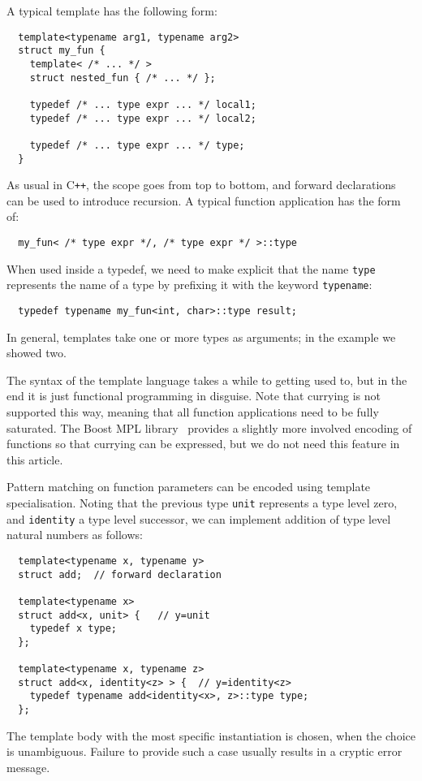 \documentclass{llncs}
\newcommand*{\Cpp}{C\texttt{++}}
\begin{document}
  A typical template has the following form:
  \begin{lstlisting}
  template<typename arg1, typename arg2>
  struct my_fun {
    template< /* ... */ >
    struct nested_fun { /* ... */ };

    typedef /* ... type expr ... */ local1;
    typedef /* ... type expr ... */ local2;

    typedef /* ... type expr ... */ type;
  }
  \end{lstlisting}
  As usual in \Cpp, the scope goes from top to bottom,
  and forward declarations can be used to introduce recursion.
  A typical function application has the form of:
  \begin{lstlisting}
  my_fun< /* type expr */, /* type expr */ >::type
  \end{lstlisting}
  When used inside a typedef, we need to make explicit that the
  name \lstinline$type$ represents the name of a type by prefixing
  it with the keyword \lstinline$typename$:
  \begin{lstlisting}
  typedef typename my_fun<int, char>::type result;
  \end{lstlisting}
  In general, templates take one or more types as arguments; in
  the example we showed two.

  The syntax of the template language takes a while to getting used to,
  but in the end it is just functional programming in disguise.
  Note that currying is not supported this way, meaning that all
  function applications need to be fully saturated. The Boost MPL
  library~\cite{boost} provides a slightly more involved encoding of functions
  so that currying can be expressed, but we do not need this
  feature in this article.

  Pattern matching on function parameters can be encoded using
  template specialisation. Noting that the previous type
  \lstinline$unit$ represents a type level zero, and
  \lstinline$identity$ a type level successor, we can implement
  addition of type level natural numbers as follows:
  \begin{lstlisting}
  template<typename x, typename y>
  struct add;  // forward declaration

  template<typename x>
  struct add<x, unit> {   // y=unit
    typedef x type;
  };

  template<typename x, typename z>
  struct add<x, identity<z> > {  // y=identity<z>
    typedef typename add<identity<x>, z>::type type;
  };
  \end{lstlisting}
  The template body with the most specific instantiation is
  chosen, when the choice is unambiguous. Failure to provide such a case
  usually results in a cryptic error message.
\end{document}
